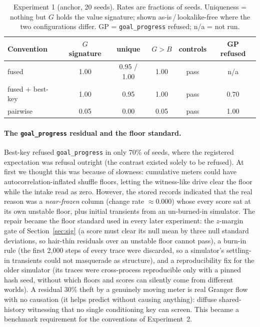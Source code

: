 \documentclass[11pt]{article}
\newcommand{\pkg}[1]{\texttt{#1}}
\begin{document}
\begin{table}[t]
\centering\small
\caption{Experiment 1 (anchor, 20 seeds). Rates are fractions of seeds. Uniqueness =
nothing but $G$ holds the value signature; shown as-is\,/\,lookalike-free where the two
configurations differ. GP = \pkg{goal\_progress} refused; n/a = not run.}
\label{tab:v1}
\begin{tabular}{@{}lccccc@{}}
\toprule
Convention & $G$ signature & unique & $G>B$ & controls & GP refused \\
\midrule
fused & 1.00 & 0.95 / 1.00 & 1.00 & pass & n/a \\
fused + best-key & 1.00 & 0.95 & 1.00 & pass & 0.70 \\
pairwise & 0.05 & 0.00 & 0.05 & pass & 1.00 \\
\bottomrule
\end{tabular}
\end{table}

\paragraph{The \pkg{goal\_progress} residual and the floor standard.}
Best-key refused \pkg{goal\_progress} in only 70\% of seeds, where the registered
expectation was refusal outright (the contrast existed solely to be refused). At first 
we thought this was because of slowness: cumulative meters could have autocorrelation-inflated 
shuffle floors, letting the witness-like drive clear the floor while the intake read as zero.
However, the stored records indicated that the real reason was a \emph{near-frozen} column (change
rate $\approx 0.000$) whose every score sat at its own unstable floor, plus initial transients from an 
un-burned-in simulator. The repair became the floor standard used in
every later experiment: the $z$-margin gate of Section~\ref{sec:sig} (a score must
clear its null mean by three null standard deviations, so hair-thin residuals over an
unstable floor cannot pass), a burn-in rule (the first 2{,}000 steps of every trace were
discarded, so a simulator's settling-in transients could not masquerade as structure), and
a reproducibility fix for the older simulator (its traces were cross-process
reproducible only with a pinned hash seed, without which floors and scores can silently
come from different worlds). A residual 30\% theft by a genuinely moving
meter is real Granger flow with no causation (it helps predict without causing
anything): diffuse shared-history witnessing that no
single conditioning key can screen. This became a benchmark requirement for the
conventions of Experiment~2.
\end{document}
